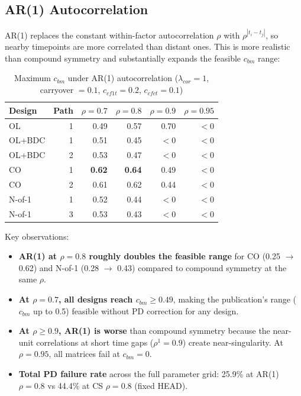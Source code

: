 \documentclass[11pt]{article}
\begin{document}
\subsection{AR(1) Autocorrelation}

AR(1) replaces the constant within-factor autocorrelation
$\rho$ with $\rho^{|t_i - t_j|}$, so nearby timepoints are
more correlated than distant ones. This is more realistic
than compound symmetry and substantially expands the feasible
$c_{bm}$ range:

\begin{table}[h]
\centering
\caption{Maximum $c_{bm}$ under AR(1) autocorrelation
  ($\lambda_{cor} = 1$, carryover $= 0.1$,
  $c_{cf1t} = 0.2$, $c_{cfct} = 0.1$)}
\begin{tabular}{lr|rrrr}
\toprule
Design & Path & $\rho = 0.7$ & $\rho = 0.8$ &
  $\rho = 0.9$ & $\rho = 0.95$ \\
\midrule
OL & 1 & 0.49 & 0.57 & 0.70 & $<0$ \\
OL+BDC & 1 & 0.51 & 0.45 & $<0$ & $<0$ \\
OL+BDC & 2 & 0.53 & 0.47 & $<0$ & $<0$ \\
CO & 1 & \textbf{0.62} & \textbf{0.64} & 0.49 & $<0$ \\
CO & 2 & 0.61 & 0.62 & 0.44 & $<0$ \\
N-of-1 & 1 & 0.52 & 0.44 & $<0$ & $<0$ \\
N-of-1 & 3 & 0.53 & 0.43 & $<0$ & $<0$ \\
\bottomrule
\end{tabular}
\end{table}

Key observations:

\begin{itemize}
\item \textbf{AR(1) at $\rho = 0.8$ roughly doubles the
  feasible range} for CO (0.25 $\to$ 0.62) and N-of-1
  (0.28 $\to$ 0.43) compared to compound symmetry at the
  same $\rho$.

\item \textbf{At $\rho = 0.7$, all designs reach
  $c_{bm} \geq 0.49$}, making the publication's range
  ($c_{bm}$ up to 0.5) feasible without PD correction
  for any design.

\item \textbf{At $\rho \geq 0.9$, AR(1) is worse} than
  compound symmetry because the near-unit correlations at
  short time gaps ($\rho^1 = 0.9$) create near-singularity.
  At $\rho = 0.95$, all matrices fail at $c_{bm} = 0$.

\item \textbf{Total PD failure rate} across the full
  parameter grid: 25.9\% at AR(1) $\rho = 0.8$ vs
  44.4\% at CS $\rho = 0.8$ (fixed HEAD).
\end{itemize}
\end{document}
